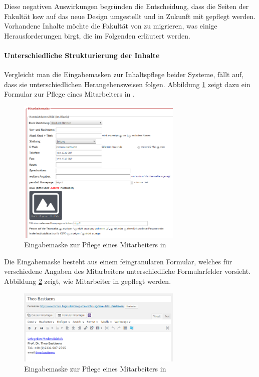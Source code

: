         Diese negativen Auswirkungen 
        begründen die Entscheidung, dass die Seiten der Fakultät \gls{ksw}
        auf das neue Design umgestellt und in Zukunft mit {\imperia} gepflegt werden.
        Vorhandene Inhalte möchte die Fakultät von {\wordpress} zu {\imperia} migrieren,
        was einige Herausforderungen birgt, die im Folgenden erläutert werden.

        \paragraph{Unterschiedliche Strukturierung der Inhalte}
        Vergleicht man die Eingabemasken zur Inhaltspflege beider Systeme, fällt auf,
        dass sie unterschiedlichen Herangehensweisen folgen.
        Abbildung \ref{image:introductionFernUniImperiaForm} zeigt dazu ein Formular
        zur Pflege eines Mitarbeiters in {\imperia}.

        \begin{figure}[htb]
            \centering
            \includegraphics[width=0.7\textwidth]{../resources/imperia/team.png}
            \caption{Eingabemaske zur Pflege eines Mitarbeiters in {\imperia}}
            \label{image:introductionFernUniImperiaForm}
        \end{figure}

        Die Eingabemaske besteht aus einem feingranularen Formular,
        welches für verschiedene Angaben des Mitarbeiters unterschiedliche Formularfelder
        vorsieht.
        Abbildung \ref{image:introductionFernUniWordpressForm} zeigt,
        wie Mitarbeiter in {\wordpress} gepflegt werden.

        \begin{figure}[htb]
            \centering
            \includegraphics[width=0.7\textwidth]{../resources/wordpress/teachers.png}
            \caption{Eingabemaske zur Pflege eines Mitarbeiters in {\wordpress}}
            \label{image:introductionFernUniWordpressForm}
        \end{figure}
        
